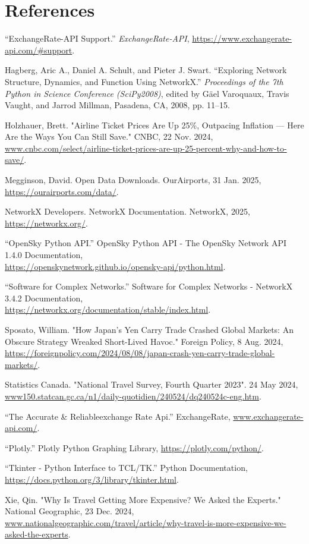 \documentclass[fontsize=11pt]{article}
\begin{document}
\section*{References}
\begingroup
    \setlength{\parskip}{1em}
\begin{hangparas}{.25in}{1}

“ExchangeRate-API Support.” \textit{ExchangeRate-API}, \href{https://www.exchangerate-api.com/\#support}{https://www.exchangerate-api.com/\#support}. 

Hagberg, Aric A., Daniel A. Schult, and Pieter J. Swart. “Exploring Network Structure, Dynamics, and Function Using NetworkX.” \textit{Proceedings of the 7th Python in Science Conference (SciPy2008)}, edited by Gäel Varoquaux, Travis Vaught, and Jarrod Millman, Pasadena, CA, 2008, pp. 11–15.

Holzhauer, Brett. "Airline Ticket Prices Are Up 25\%, Outpacing Inflation — Here Are the Ways You Can Still Save." CNBC, 22 Nov. 2024, \\ \url{www.cnbc.com/select/airline-ticket-prices-are-up-25-percent-why-and-how-to-save/}.

Megginson, David. Open Data Downloads. OurAirports, 31 Jan. 2025, \url{https://ourairports.com/data/}.

NetworkX Developers. NetworkX Documentation. NetworkX, 2025, \url{https://networkx.org/}.

“OpenSky Python API.” OpenSky Python API - The OpenSky Network API 1.4.0 Documentation, \\ \url{https://openskynetwork.github.io/opensky-api/python.html}.

“Software for Complex Networks.” Software for Complex Networks - NetworkX 3.4.2 Documentation,\\ 
\url{https://networkx.org/documentation/stable/index.html}.

Sposato, William. "How Japan’s Yen Carry Trade Crashed Global Markets: An Obscure Strategy Wreaked Short-Lived Havoc." Foreign Policy, 8 Aug. 2024,\\ \url{https://foreignpolicy.com/2024/08/08/japan-crash-yen-carry-trade-global-markets/}.

Statistics Canada. "National Travel Survey, Fourth Quarter 2023". 24 May 2024, \url{www150.statcan.gc.ca/n1/daily-quotidien/240524/dq240524c-eng.htm}.

“The Accurate \& Reliableexchange Rate Api.” ExchangeRate, \url{www.exchangerate-api.com/}.

“Plotly.” Plotly Python Graphing Library, \url{https://plotly.com/python/}.

“Tkinter - Python Interface to TCL/TK.” Python Documentation, \\ \url{https://docs.python.org/3/library/tkinter.html}.

Xie, Qin. "Why Is Travel Getting More Expensive? We Asked the Experts." National Geographic, 23 Dec. 2024, \url{www.nationalgeographic.com/travel/article/why-travel-is-more-expensive-we-asked-the-experts}.

\end{hangparas}
\end{document}
